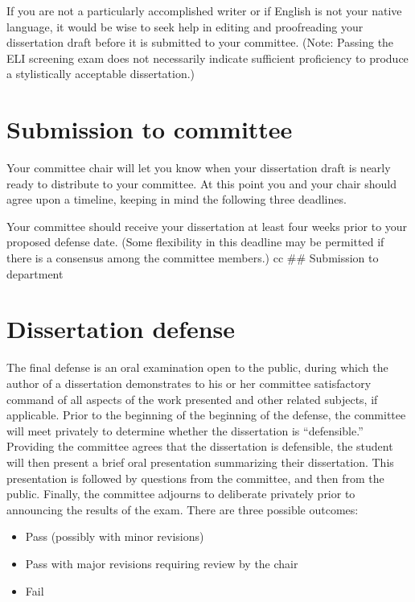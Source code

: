 \documentclass[
]{book}
\providecommand{\tightlist}{%
  \setlength{\itemsep}{0pt}\setlength{\parskip}{0pt}}
\begin{document}
If you are not a particularly accomplished writer or if English is not your native language, it would be wise to seek help in editing and proofreading your dissertation draft before it is submitted to your committee. (Note: Passing the ELI screening exam does not necessarily indicate sufficient proficiency to produce a stylistically acceptable dissertation.)

\hypertarget{submission-to-committee}{%
\section{Submission to committee}\label{submission-to-committee}}

Your committee chair will let you know when your dissertation draft is nearly ready to distribute to your committee. At this point you and your chair should agree upon a timeline, keeping in mind the following three deadlines.

Your committee should receive your dissertation at least four weeks prior to your proposed defense date. (Some flexibility in this deadline may be permitted if there is a consensus among the committee members.) cc \#\# Submission to department

\hypertarget{dissertation-defense}{%
\section{Dissertation defense}\label{dissertation-defense}}

The final defense is an oral examination open to the public, during which the author of a dissertation demonstrates to his or her committee satisfactory command of all aspects of the work presented and other related subjects, if applicable. Prior to the beginning of the beginning of the defense, the committee will meet privately to determine whether the dissertation is ``defensible.'' Providing the committee agrees that the dissertation is defensible, the student will then present a brief oral presentation summarizing their dissertation. This presentation is followed by questions from the committee, and then from the public. Finally, the committee adjourns to deliberate privately prior to announcing the results of the exam. There are three possible outcomes:

\begin{itemize}
\tightlist
\item
  Pass (possibly with minor revisions)
\item
  Pass with major revisions requiring review by the chair
\item
  Fail
\end{itemize}
\end{document}
